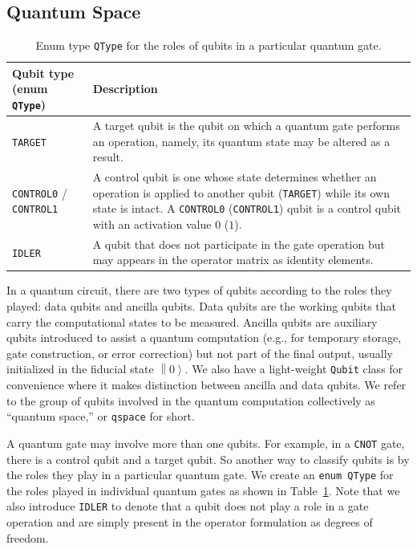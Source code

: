 \documentclass[a4paper,titlepage]{article}
\begin{document}
    \subsection{Quantum Space}\label{subsec:quantum-space}

    \begin{table}[htbp]
        \centering
        \begin{tabularx}{\linewidth}{l|X}
            \hline
            \textbf{Qubit type (enum \texttt{QType})} & \textbf{Description} \\
            \hline
            \texttt{TARGET} & A target qubit is the qubit on which a quantum gate performs an operation, namely, its quantum state may be altered as a result. \\
            \texttt{CONTROL0} / \texttt{CONTROL1} & A control qubit is one whose state determines whether an operation is applied to another qubit (\texttt{TARGET})
            while its own state is intact.
            A \texttt{CONTROL0} (\texttt{CONTROL1}) qubit is a control qubit with an activation value $0$ ($1$). \\
            \texttt{IDLER} & A qubit that does not participate in the gate operation but may appears in the operator matrix as identity elements. \\
            \hline
        \end{tabularx}
        \caption{Enum type \texttt{QType} for the roles of qubits in a particular quantum gate.}
        \label{tab:gate-role}
    \end{table}


    In a quantum circuit, there are two types of qubits according to the roles they played: data qubits and ancilla qubits.
    Data qubits are the working qubits that carry the computational states to be measured.
    Ancilla qubits are auxiliary qubits introduced to assist a quantum computation (e.g., for temporary storage, gate construction, or error correction)
    but not part of the final output, usually initialized in the fiducial state $\left\| 0 \right\rangle$.
    We also have a light-weight \texttt{Qubit} class for convenience where it makes distinction between ancilla and data qubits.
    We refer to the group of qubits involved in the quantum computation collectively as ``quantum space,'' or \texttt{qspace} for short.


    A quantum gate may involve more than one qubits.
    For example, in a \texttt{CNOT} gate, there is a control qubit and a target qubit.
    So another way to classify qubits is by the roles they play in a particular quantum gate.
    We create an \texttt{enum QType} for the roles played in individual quantum gates as shown in Table~\ref{tab:gate-role}.
    Note that we also introduce \texttt{IDLER} to denote that a qubit does not play a role in a gate operation and are simply present in the operator formulation as degrees of
    freedom.
\end{document}
